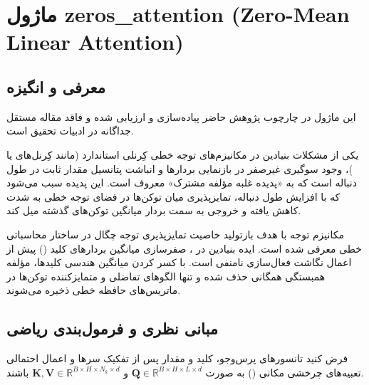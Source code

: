\section{ماژول zeros\_attention (Zero-Mean Linear Attention)}
\label{sec:module_zeros_attention}

\subsection{معرفی و انگیزه}
این ماژول در چارچوب پژوهش حاضر پیاده‌سازی و ارزیابی شده و فاقد مقاله مستقل جداگانه در ادبیات تحقیق است.

یکی از مشکلات بنیادین در مکانیزم‌های توجه خطی کِرنلی استاندارد (مانند کِرنل‌های  یا )، وجود سوگیری غیرصفر در بازنمایی بردارها و انباشت پتانسیل مقدار ثابت در طول دنباله است که به «پدیده غلبه مؤلفه مشترک» معروف است. این پدیده سبب می‌شود که با افزایش طول دنباله، تمایزپذیری میان توکن‌ها در فضای توجه خطی به شدت کاهش یافته و خروجی به سمت بردار میانگین توکن‌های گذشته میل کند.

مکانیزم توجه  با هدف بازتولید خاصیت تمایزپذیری توجه چگال در ساختار محاسباتی خطی معرفی شده است. ایده بنیادین در ، صفرسازی میانگین بردارهای کلید () پیش از اعمال نگاشت فعال‌سازی نامنفی  است. با کسر کردن میانگین هندسی کلیدها، مؤلفه همبستگی همگانی حذف شده و تنها الگوهای تفاضلی و متمایزکننده توکن‌ها در ماتریس‌های حافظه خطی ذخیره می‌شوند.

\subsection{مبانی نظری و فرمول‌بندی ریاضی}
فرض کنید تانسورهای پرس‌وجو، کلید و مقدار پس از تفکیک سرها و اعمال احتمالی تعبیه‌های چرخشی مکانی () به صورت $\mathbf{Q} \in \mathbb{R}^{B \times H \times L \times d}$ و $\mathbf{K}, \mathbf{V} \in \mathbb{R}^{B \times H \times N_k \times d}$ باشند. 

